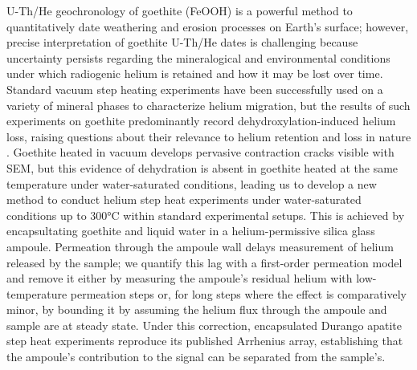 %
%

U-Th/He geochronology of goethite (FeOOH) is a powerful method to
quantitatively date weathering and erosion processes on Earth's surface;
however, precise interpretation of goethite U-Th/He dates is challenging
because uncertainty persists regarding the mineralogical and environmental
conditions under which radiogenic helium is retained and how it may be lost over
time. Standard vacuum step heating experiments have been successfully
used on a variety of mineral phases to characterize helium migration,
but the results of such experiments on goethite predominantly record 
dehydroxylation-induced helium loss, raising questions about their relevance to
helium retention and loss in nature \citep{farley2024}. Goethite heated in
vacuum develops pervasive contraction cracks visible with SEM, but this evidence 
of dehydration is absent in goethite heated at the same temperature under 
water-saturated conditions, leading us to develop a new method to conduct helium
step heat experiments under water-saturated conditions up to 300°C within 
standard experimental setups. This is achieved by encapsultating goethite and 
liquid water in a helium-permissive silica glass ampoule. Permeation through the 
ampoule wall delays measurement of helium released by the sample; we quantify this 
lag with a first-order permeation model and remove it either by measuring the ampoule's 
residual helium with low-temperature permeation steps or, for long steps where the 
effect is comparatively minor, by bounding it by assuming the helium flux through 
the ampoule and sample are at steady state. Under this correction, encapsulated 
Durango apatite step heat experiments reproduce its published Arrhenius array, 
establishing that the ampoule's contribution to the signal can be separated from the sample's. 


